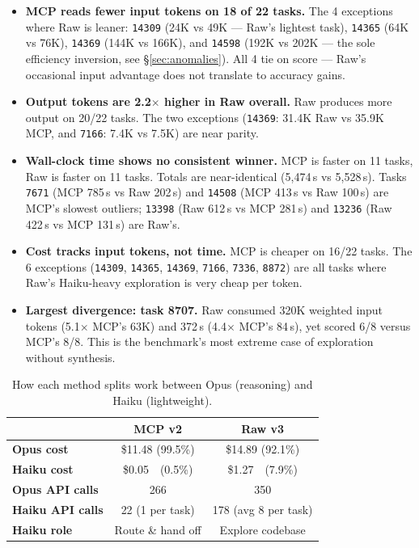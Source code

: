 \begin{itemize}[nosep, leftmargin=*]
\item \textbf{MCP reads fewer input tokens on 18 of 22 tasks.}
      The 4 exceptions where Raw is leaner:
      \texttt{14309} (24K vs 49K --- Raw's lightest task),
      \texttt{14365} (64K vs 76K),
      \texttt{14369} (144K vs 166K),
      and \texttt{14598} (192K vs 202K --- the sole efficiency inversion,
      see \S\ref{sec:anomalies}).
      All 4 tie on score --- Raw's occasional input advantage does not
      translate to accuracy gains.

\item \textbf{Output tokens are 2.2$\times$ higher in Raw overall.}
      Raw produces more output on 20/22 tasks.
      The two exceptions (\texttt{14369}: 31.4K Raw vs 35.9K MCP, and
      \texttt{7166}: 7.4K vs 7.5K) are near parity.

\item \textbf{Wall-clock time shows no consistent winner.}
      MCP is faster on 11 tasks, Raw is faster on 11 tasks.
      Totals are near-identical (5{,}474\,s vs 5{,}528\,s).
      Tasks \texttt{7671} (MCP 785\,s vs Raw 202\,s) and
      \texttt{14508} (MCP 413\,s vs Raw 100\,s) are MCP's slowest
      outliers; \texttt{13398} (Raw 612\,s vs MCP 281\,s) and
      \texttt{13236} (Raw 422\,s vs MCP 131\,s) are Raw's.

\item \textbf{Cost tracks input tokens, not time.}
      MCP is cheaper on 16/22 tasks.  The 6 exceptions
      (\texttt{14309}, \texttt{14365}, \texttt{14369}, \texttt{7166},
      \texttt{7336}, \texttt{8872}) are all tasks where Raw's
      Haiku-heavy exploration is very cheap per token.

\item \textbf{Largest divergence: task 8707.}
      Raw consumed 320K weighted input tokens (5.1$\times$ MCP's 63K)
      and 372\,s (4.4$\times$ MCP's 84\,s), yet scored 6/8 versus
      MCP's 8/8.  This is the benchmark's most extreme case of
      exploration without synthesis.
\end{itemize}

\begin{table}[!htbp]
\centering
\caption{How each method splits work between Opus (reasoning) and Haiku (lightweight).}\label{tab:model-cmp}
\begin{tabular}{l cc}
\toprule
& \textbf{MCP v2} & \textbf{Raw v3} \\
\midrule
\textbf{Opus cost}          & \$11.48 (99.5\%)   & \$14.89 (92.1\%) \\
\textbf{Haiku cost}         & \$0.05\ \ (0.5\%)  & \$1.27\ \ (7.9\%) \\
\textbf{Opus API calls}     & 266                & 350 \\
\textbf{Haiku API calls}    & 22 (1 per task)    & 178 (avg 8 per task) \\
\textbf{Haiku role}         & Route \& hand off  & Explore codebase \\
\bottomrule
\end{tabular}
\end{table}

